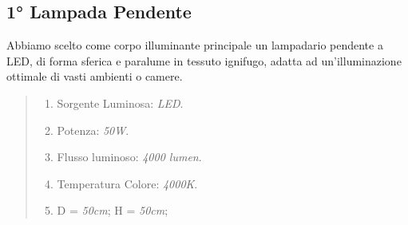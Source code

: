 \documentclass[italian, 12pt, a4paper]{article}
\begin{document}
\subsection{1° Lampada Pendente}
Abbiamo scelto come corpo illuminante principale un lampadario pendente a LED, di forma sferica e paralume in tessuto ignifugo, adatta ad un'illuminazione ottimale di vasti ambienti o camere.
\begin{quote}
    \begin{enumerate}
        \item Sorgente Luminosa: \emph{LED}.
        \item Potenza: \emph{50W}.
        \item Flusso luminoso: \emph{4000 lumen}.
        \item Temperatura Colore: \emph{4000K}.
        \item D = \emph{50cm}; H = \emph{50cm};
    \end{enumerate}
    \vspace{-40pt}
\end{quote}
\end{document}
